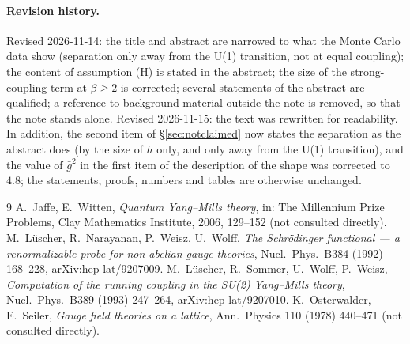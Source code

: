 \documentclass[11pt,a4paper]{article}
\theoremstyle{definition}
\theoremstyle{remark}
\newcommand{\gb}{\bar g^{2}}
\begin{document}
\paragraph{Revision history.} Revised 2026-11-14: the title and abstract are narrowed to what the Monte Carlo data show (separation only away from the U(1) transition, not at equal coupling); the content of assumption (H) is stated in the abstract; the size of the strong-coupling term at $\beta\ge2$ is corrected; several statements of the abstract are qualified; a reference to background material outside the note is removed, so that the note stands alone. Revised 2026-11-15: the text was rewritten for readability. In addition, the second item of \S\ref{sec:notclaimed} now states the separation as the abstract does (by the size of $h$ only, and only away from the U(1) transition), and the value of $\gb$ in the first item of the description of the shape was corrected to $4.8$; the statements, proofs, numbers and tables are otherwise unchanged.

\begin{thebibliography}{9}
 A.~Jaffe, E.~Witten, \emph{Quantum Yang--Mills theory}, in: The Millennium Prize Problems, Clay Mathematics Institute, 2006, 129--152 (not consulted directly).
 M.~Lüscher, R.~Narayanan, P.~Weisz, U.~Wolff, \emph{The Schrödinger functional --- a renormalizable probe for non-abelian gauge theories}, Nucl.\ Phys.\ B384 (1992) 168--228, arXiv:hep-lat/9207009.
 M.~Lüscher, R.~Sommer, U.~Wolff, P.~Weisz, \emph{Computation of the running coupling in the SU(2) Yang--Mills theory}, Nucl.\ Phys.\ B389 (1993) 247--264, arXiv:hep-lat/9207010.
 K.~Osterwalder, E.~Seiler, \emph{Gauge field theories on a lattice}, Ann.\ Physics 110 (1978) 440--471 (not consulted directly).
\end{thebibliography}
\end{document}
